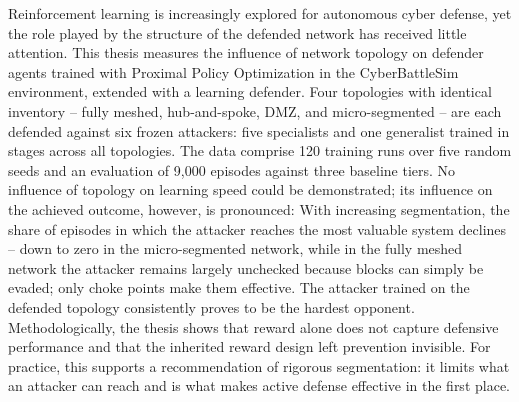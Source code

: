 Reinforcement learning is increasingly explored for autonomous cyber
defense, yet the role played by the structure of the defended network has
received little attention. This thesis measures the influence of network
topology on defender agents trained with Proximal Policy Optimization in
the CyberBattleSim environment, extended with a learning defender. Four topologies with identical inventory -- fully meshed,
hub-and-spoke, DMZ, and micro-segmented -- are each defended against six
frozen attackers: five specialists and one generalist trained in stages
across all topologies. The data comprise 120 training runs over five
random seeds and an evaluation of 9{,}000 episodes against three baseline
tiers. No influence of topology on learning speed could be demonstrated;
its influence on the achieved outcome, however, is pronounced: With
increasing segmentation, the share of episodes in which the attacker
reaches the most valuable system declines -- down to zero in the
micro-segmented network, while in the fully meshed network the attacker
remains largely unchecked because blocks can simply be evaded; only choke
points make them effective. The attacker trained on the defended topology
consistently proves to be the hardest opponent. Methodologically, the
thesis shows that reward alone does not capture defensive performance and
that the inherited reward design left prevention invisible. For practice,
this supports a recommendation of rigorous segmentation: it limits what an
attacker can reach and is what makes active defense effective in the
first place.
